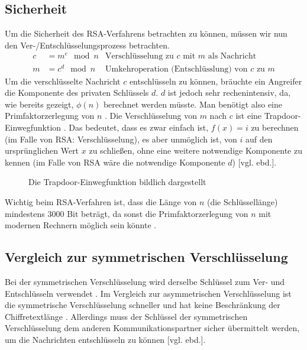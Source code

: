 \documentclass[a4paper,ngerman, headheight=28pt,12pt]{scrartcl}
\newcommand{\vcite}[1]{\cite[vgl.][]{#1}}
\newcommand{\vebd}{[vgl. ebd.]}
\begin{document}
\subsection{Sicherheit}

Um die Sicherheit des RSA-Verfahrens betrachten zu können, müssen wir nun den Ver-/Entschlüsselungsprozess betrachten.
\begin{equation*}
  \begin{aligned}
    c & = m^e \mod n & \text{Verschlüsselung zu $c$ mit $m$ als Nachricht}    \\
    m & = c^d \mod n & \text{Umkehroperation (Entschlüsslung) von $c$ zu $m$}
  \end{aligned}
\end{equation*}
Um die verschlüsselte Nachricht $c$ entschlüsseln zu können, bräuchte ein Angreifer die Komponente des privaten Schlüssels $d$. $d$ ist jedoch sehr rechenintensiv, da, wie bereits gezeigt, $\phi(n)$ berechnet werden müsste. Man benötigt also eine Primfaktorzerlegung von $n$ \vcite{EulersTotientFunction}. Die Verschlüsselung von $m$ nach $c$ ist eine Trapdoor-Einwegfunktion \vcite{RsaTrapdoor}. Das bedeutet, dass es zwar einfach ist, $f(x) = i$ zu berechnen (im Falle von RSA: Verschlüsselung), es aber unmöglich ist, von $i$ auf den ursprünglichen Wert $x$ zu schließen, ohne eine weitere notwendige Komponente zu kennen (im Falle von RSA wäre die notwendige Komponente $d$) \vebd.
\begin{figure}[ht]
  \centering
  
  \caption{Die Trapdoor-Einwegfunktion bildlich dargestellt\vcite{fig:TrapdoorPermutation} \label{fig:TrapdoorFunc}}
\end{figure}
Wichtig beim RSA-Verfahren ist, dass die Länge von $n$ (die Schlüssellänge) mindestens 3000 Bit beträgt, da sonst die Primfaktorzerlegung von $n$ mit modernen Rechnern möglich sein könnte \vcite{RsaKeyLength}.
\subsection{Vergleich zur symmetrischen Verschlüsselung}
Bei der symmetrischen Verschlüsselung wird derselbe Schlüssel zum Ver- und Entschlüsseln verwendet \vcite{GeneralSymmetricCryptography}.
Im Vergleich zur asymmetrischen Verschlüsselung ist die symmetrische Verschlüsselung schneller und hat keine Beschränkung der Chiffretextlänge \vcite{RsaAESAnalysis, OpensslRsaMaxLength}. Allerdings muss der Schlüssel der symmetrischen Verschlüsselung dem anderen Kommunikationspartner sicher übermittelt werden, um die Nachrichten entschlüsseln zu können \vebd.
\end{document}
